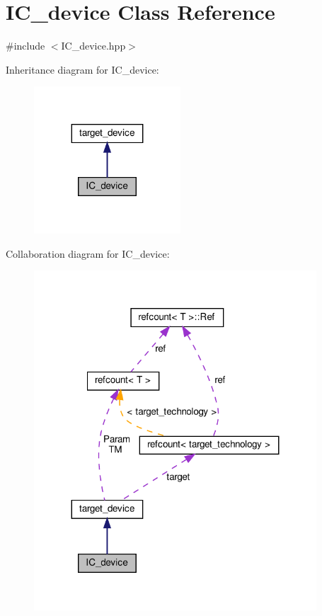 \hypertarget{classIC__device}{}\section{I\+C\+\_\+device Class Reference}
\label{classIC__device}


{\ttfamily \#include $<$I\+C\+\_\+device.\+hpp$>$}



Inheritance diagram for I\+C\+\_\+device\+:
\nopagebreak
\begin{figure}[H]
\begin{center}
\leavevmode
\includegraphics[width=155pt]{dc/dba/classIC__device__inherit__graph}
\end{center}
\end{figure}


Collaboration diagram for I\+C\+\_\+device\+:
\nopagebreak
\begin{figure}[H]
\begin{center}
\leavevmode
\includegraphics[width=299pt]{db/dd2/classIC__device__coll__graph}
\end{center}
\end{figure}
